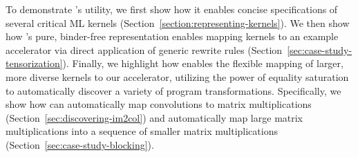 To demonstrate \g's utility,
  we first show how it enables
  concise specifications of several
  critical ML kernels
  (Section~\ref{section:representing-kernels}).
We then show how
  \g's pure, binder-free
  representation enables mapping kernels
  to an example accelerator via
  direct application of generic rewrite rules
  (Section~\ref{sec:case-study-tensorization}).
Finally,
  we highlight how \g
  enables the
  flexible mapping of
  larger, more diverse kernels
  to our accelerator,
  utilizing the power
  of equality saturation
  to automatically discover
  a variety of program transformations.
Specifically,
  we show how \g can automatically
  map convolutions to matrix multiplications
  (Section~\ref{sec:discovering-im2col})
  and automatically
  map large matrix multiplications into a
  sequence of smaller matrix multiplications
  (Section~\ref{sec:case-study-blocking}).
  
  


  
  
  
  

    
    

